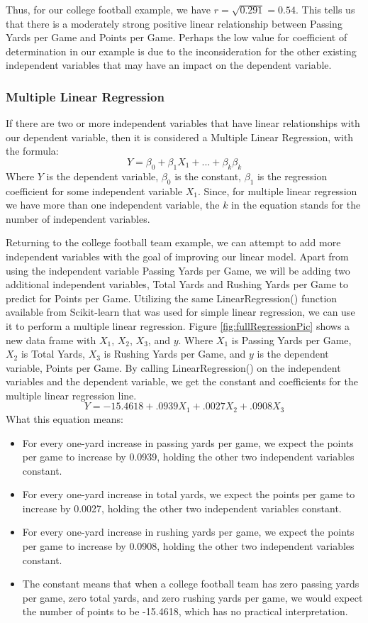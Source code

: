 \documentclass[a4paper,12pt]{report}
\begin{document}

Thus, for our college football example, we have $r=\sqrt{0.291}=0.54$. This tells us that there is a moderately strong positive linear relationship between Passing Yards per Game and Points per Game. Perhaps the low value for coefficient of determination in our example is due to the inconsideration for the other existing independent variables that may have an impact on the dependent variable. 


\subsubsection{Multiple Linear Regression}
If there are two or more independent variables that have linear relationships with our dependent variable, then it is considered a Multiple Linear Regression, with the formula:
$$Y=\beta_0+\beta_1X_1+...+\beta_k\beta_k$$
Where $Y$ is the dependent variable, $\beta_0$ is the constant, $\beta_1$ is the regression coefficient for some independent variable $X_1$. Since, for multiple linear regression we have more than one independent variable, the $k$ in the equation stands for the number of independent variables.

Returning to the college football team example, we can attempt to add more independent variables with the goal of improving our linear model. Apart from using the independent variable Passing Yards per Game, we will be adding two additional independent variables, Total Yards and Rushing Yards per Game to predict for Points per Game. Utilizing the same LinearRegression() function available from Scikit-learn that was used for simple linear regression, we can use it to perform a multiple linear regression. Figure \ref{fig:fullRegressionPic} shows a new data frame with $X_1$, $X_2$, $X_3$, and $y$. Where $X_1$ is Passing Yards per Game, $X_2$ is Total Yards, $X_3$ is Rushing Yards per Game, and $y$ is the dependent variable, Points per Game. By calling LinearRegression() on the independent variables and the dependent variable, we get the constant and coefficients for the multiple linear regression line.
$$Y=-15.4618+.0939X_1+.0027X_2+.0908X_3$$
What this equation means:
\vspace*{-.9cm}
\begin{itemize}[,]
    \setlength\itemsep{-.1cm}
    \item For every one-yard increase in passing yards per game, we expect the points per game to increase by 0.0939, holding the other two independent variables constant.
    \item For every one-yard increase in total yards, we expect the points per game to increase by 0.0027, holding the other two independent variables constant.
    \item For every one-yard increase in rushing yards per game, we expect the points per game to increase by 0.0908, holding the other two independent variables constant.
    \item The constant means that when a college football team has zero passing yards per game, zero total yards, and zero rushing yards per game, we would expect the number of points to be -15.4618, which has no practical interpretation. 
\end{itemize}
\end{document}
